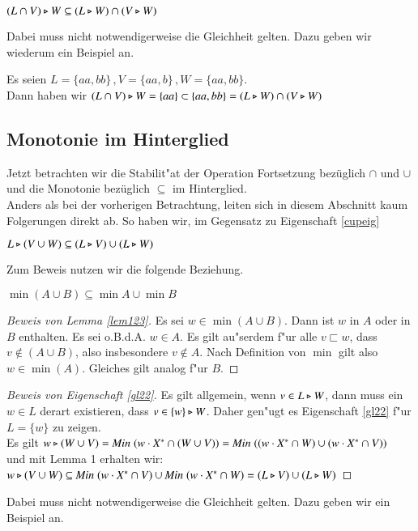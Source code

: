 \begin{eigen}
$(L\cap V) \triangleright W \subseteq (L\triangleright W) \cap (V\triangleright W)$
\end{eigen}
Dabei muss nicht notwendigerweise die Gleichheit gelten. Dazu geben wir wiederum ein Beispiel an.

\vspace{2ex}

\begin{beispiel}
Es seien $L= \{aa,bb\}\, ,V = \{aa,b\}\, ,W = \{aa,bb\}$. \\Dann haben wir $(L\cap V) \triangleright W = \{aa\} \subset \{aa,bb\} = (L\triangleright W) \cap (V\triangleright W)$
\end{beispiel}

\subsection{Monotonie im Hinterglied}
Jetzt betrachten wir die Stabilit"at der Operation Fortsetzung bezüglich $\cap$ und $\cup$ und die Monotonie bezüglich $\subseteq$ im Hinterglied.\\
Anders als bei der vorherigen Betrachtung, leiten sich in diesem Abschnitt kaum Folgerungen direkt ab.
So haben wir, im Gegensatz zu Eigenschaft \ref{cupeig}

\vspace{2ex}

\begin{eigen}\label{gl22}
$L\triangleright (V\cup W)\subseteq (L\triangleright V) \cup (L\triangleright W)$
\end{eigen}
Zum Beweis nutzen wir die folgende Beziehung.

\vspace{2ex}

\begin{lem}\label{lem123}
$\min (A\cup B) \subseteq \min A \cup \min B$
\end{lem}

\begin{proof}[Beweis von Lemma \ref{lem123}]
Es sei $w\in \min (A\cup B)$. Dann ist $w$ in $A$ oder in $B$ enthalten. Es sei o.B.d.A. $w\in A$. Es gilt au"serdem f"ur alle $v\sqsubset w$, dass $v\notin (A\cup B)$, also insbesondere $v\notin A$. Nach Definition von $\min$ gilt also $w\in\min(A)$. Gleiches gilt analog f"ur $B$.
\end{proof}
\begin{proof}[Beweis von Eigenschaft \ref{gl22}]
Es gilt allgemein, wenn $v\in L\triangleright W$, dann muss ein $w\in L$ derart existieren, dass $v\in \{w\}\triangleright W$. 
Daher gen"ugt es Eigenschaft \ref{gl22} f"ur $L=\{w\}$ zu zeigen.\\
Es gilt $w \triangleright (W\cup V)=\mathit{Min}\; (w\cdot X^* \cap (W\cup V)) =\mathit{Min}\; ((w\cdot X^* \cap W) \cup (w\cdot X^* \cap V))$\\
und mit Lemma 1 erhalten wir:\\
$ w\triangleright (V\cup W) \subseteq \mathit{Min}\; (w\cdot X^* \cap V) \cup \mathit{Min}\; (w\cdot X^* \cap W)=(L\triangleright V)\cup (L\triangleright W)$
\end{proof}
Dabei muss nicht notwendigerweise die Gleichheit gelten. Dazu geben wir ein Beispiel an.

